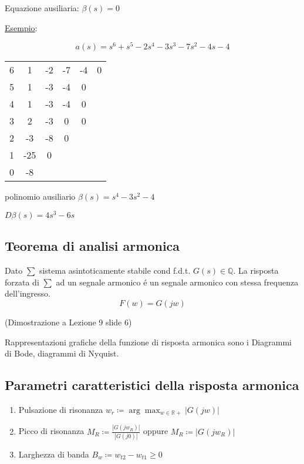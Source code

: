 \documentclass{article}
\begin{document}
Equazione ausiliaria: $ \beta(s) = 0$

\underline{Esempio}:

\begin{minipage}{0.45\textwidth}
    \[ a(s) = s^6 + s^5 - 2s^4 -3s^3 - 7s^2 -4s -4 \]
    \begin{center}
        \begin{tabular}{c|c c c c c}
            6 & 1 & -2 & -7 & -4 & 0\\
            5 & 1 & -3 & -4 & 0\\
            4 & 1 & -3 & -4 & 0\\
            \hline
            3 & 2 & -3 & 0 & 0\\
            2 & -3 & -8 & 0\\
            1 & -25 & 0\\
            0 & -8
        \end{tabular}
    \end{center}
\end{minipage}
\begin{minipage}{0.5\textwidth}
    polinomio ausiliario $\beta(s) = s^4 -3s^2 -4$

    $D\beta(s) = 4s^3 - 6s$
\end{minipage}

\subsection{Teorema di analisi armonica}
Dato $\sum$ sistema asintoticamente stabile cond f.d.t. $G(s) \in \mathbb{Q}$. La risposta forzata di $\sum$ ad un segnale armonico \'e un segnale armonico con stessa frequenza dell'ingresso.
\[ F(w) = G(jw) \]

(Dimostrazione a Lezione 9 slide 6)

Rappresentazioni grafiche della funzione di risposta armonica sono i Diagrammi di Bode, diagrammi di Nyquist.

\subsection{Parametri caratteristici della risposta armonica}
\begin{enumerate}
    \item Pulsazione di risonanza $w_r \coloneqq \arg\max_{w\in\mathbb{R+}}|G(jw)|$
    \item Picco di risonanza $M_R \coloneqq \frac{|G(jw_R)|}{|G(j0)|}$ oppure $M_R \coloneqq |G(jw_R)|$
    \item Larghezza di banda $B_w \coloneqq w_{t2} - w_{t1} \ge 0$
\end{enumerate}
\end{document}
